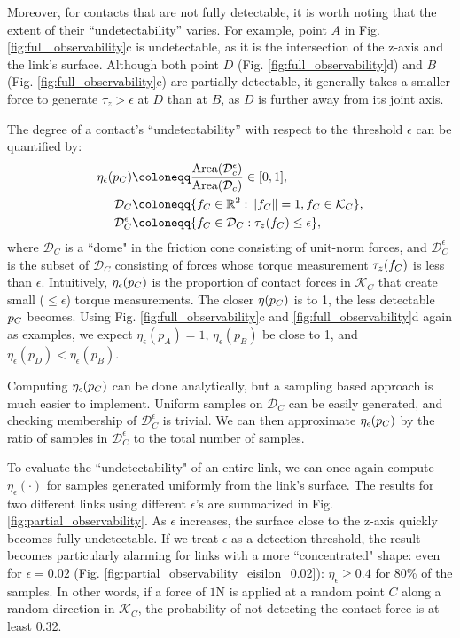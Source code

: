 Moreover, for contacts that are not fully detectable, it is worth noting that the extent of their ``undetectability'' varies. For example, point $A$ in Fig. \ref{fig:full_observability}c is undetectable, as it is the intersection of the z-axis and the link's surface. Although both point $D$ (Fig. \ref{fig:full_observability}d) and $B$ (Fig. \ref{fig:full_observability}c) are partially detectable, it generally takes a smaller force to generate $\tau_z > \epsilon$ at $D$ than at $B$, as $D$ is further away from its joint axis.

The degree of a contact's ``undetectability'' with respect to the threshold $\epsilon$ can be quantified by:
\begin{subequations}
\begin{align}
\eta_\epsilon(\pC) &\coloneqq \frac{\text{Area}(\mathcal{D}_c^\epsilon)}{\text{Area}(\mathcal{D}_c)} \in [0, 1],  \\
\mathcal{D}_C &\coloneqq \{\fC \in \mathbb{R}^2 : \norm{\fC} = 1, \fC \in \mathcal{K}_C\}, \\
\mathcal{D}_C^\epsilon &\coloneqq \{\fC \in \mathcal{D}_C : \tau_z(\fC) \leq \epsilon \}, 
\end{align}
\end{subequations}
where $\mathcal{D}_C$ is a ``dome" in the friction cone consisting of unit-norm forces, and $\mathcal{D}_C^\epsilon$ is the subset of $\mathcal{D}_C$ consisting of forces whose torque measurement $\tau_z({f}_C)$ is less than $\epsilon$. Intuitively, $\eta_\epsilon({p}_C)$ is the proportion of contact forces in $\mathcal{K}_C$ that create small ($\leq \epsilon$) torque measurements. The closer $\eta({p}_C)$ is to 1, the less detectable ${p}_C$ becomes. Using Fig. \ref{fig:full_observability}c and \ref{fig:full_observability}d again as examples, we expect $\eta_\epsilon({p}_A) = 1$, $\eta_\epsilon({p}_B)$ be close to 1, and $\eta_\epsilon({p}_D) < \eta_\epsilon({p}_B)$. 

Computing $\eta_\epsilon({p}_C)$ can be done analytically, but a sampling based approach is much easier to implement. Uniform samples on $\mathcal{D}_C$ can be easily generated, and checking membership of $\mathcal{D}_C^\epsilon$ is trivial. We can then approximate $\eta_\epsilon({p}_C)$ by the ratio of samples in $\mathcal{D}_C^\epsilon$ to the total number of samples.

To evaluate the ``undetectability" of an entire link, we can once again compute $\eta_\epsilon(\cdot)$ for samples generated uniformly from the link's surface. The results for two different links using different $\epsilon$'s are summarized in Fig. \ref{fig:partial_observability}. As $\epsilon$ increases, the surface close to the z-axis quickly becomes fully undetectable. If we treat $\epsilon$ as a detection threshold, the result becomes particularly alarming for links with a more ``concentrated" shape: even for $\epsilon=0.02$ (Fig. \ref{fig:partial_observability_eisilon_0.02}): $\eta_\epsilon \geq 0.4$ for 80\% of the samples. In other words, if a force of $1\mathrm{N}$ is applied at a random point $C$ along a random direction in $\mathcal{K}_C$, the probability of not detecting the contact force is at least 0.32.

